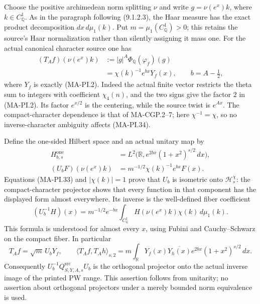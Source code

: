 Choose the positive archimedean norm splitting $\nu$ and write
$g=\nu(e^x)k$, where $k\in C_{\mathbb Q}^1$.
As in the paragraph following (9.1.2.3), the Haar measure
has the exact product decomposition $dx\,d\mu_1(k)$.
Put $m=\mu_1(C_{\mathbb Q}^1)>0$; this retains the source's
Haar normalization rather than silently assigning it mass one.
For the actual canonical character source one has
\[
 \begin{split}
 (T_Af)(\nu(e^x)k)
   &:=|g|^A\Phi_{\mathbb Q}(\varphi_f)(g)\\
   &=\chi(k)^{-1}e^{b x}Y_f(x),
          \qquad b=A-\tfrac12,
 \end{split}
 \tag{MA-PI.34}
\]
where $Y_f$ is exactly (MA-PI.2).
Indeed the actual finite vector restricts the theta sum to
integers with coefficient $\chi_4(n)$, and the two signs
give the factor $2$ in (MA-PI.2).  Its factor $e^{x/2}$
is the centering, while the source twist is $e^{Ax}$.
The compact-character dependence is that of MA-CGP.2--7;
here $\chi^{-1}=\chi$, so no inverse-character ambiguity
affects (MA-PI.34).

Define the one-sided Hilbert space and an actual unitary map by
\[
 \begin{split}
 H^{\mathrm{one}}_{b,s}
    &=L^2\bigl(\mathbb R,e^{2bx}(1+x^2)^{s/2}\,dx\bigr),\\
 (U_bF)(\nu(e^x)k)
    &=m^{-1/2}\chi(k)^{-1}e^{bx}F(x).
 \end{split}
 \tag{MA-PI.35}
\]
Equations (MA-PI.33) and $|\chi(k)|=1$ prove that $U_b$
is isometric onto $\mathcal H_s^\chi$: the compact-character
projector shows that every function in that component has
the displayed form almost everywhere.  Its inverse is the
well-defined fiber coefficient
\[
 (U_b^{-1}H)(x)=m^{-1/2}e^{-bx}
        \int_{C_{\mathbb Q}^1}H(\nu(e^x)k)\chi(k)\,d\mu_1(k).
\]
This formula is understood for almost every $x$, using
Fubini and Cauchy--Schwarz on the compact fiber.  In particular
\[
 T_A f=\sqrt m\,U_bY_f,\qquad
 \langle T_Af,T_Ah\rangle_{s,2}
     =m\int_{\mathbb R}Y_f(x)\overline{Y_h(x)}
                           e^{2bx}(1+x^2)^{s/2}\,dx.
 \tag{MA-PI.36}
\]
Consequently $U_b^{-1}Q^{\mathrm{src}}_{S,Y,A,s}U_b$
is the orthogonal projector onto the actual inverse image
of the printed PW range.  This assertion follows from
unitarity; no assertion about orthogonal projectors under
a merely bounded norm equivalence is used.

